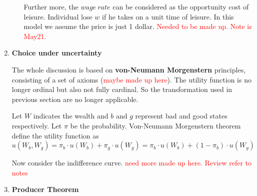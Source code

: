 \documentclass[10pt]{article}
\newenvironment{changemargin}[2]{%
  \begin{list}{}{%
    \setlength{\topsep}{0pt}%
    \setlength{\leftmargin}{#1}%
    \setlength{\rightmargin}{#2}%
    \setlength{\listparindent}{\parindent}%
    \setlength{\itemindent}{\parindent}%
    \setlength{\parsep}{\parskip}%
  }%
  \item[]}{\end{list}}
\begin{document}
\begin{changemargin}{-0.125in}{0in}
\begin{enumerate}
\begin{enumerate}
                        Further more, the $wage \: rate$ can be considered as the opportunity cost of leisure. Individual lose $w$ if he takes on a unit time of leisure. In this model we assume the price is just 1 dollar. \textcolor{red}{Needed to be made up. Note is May21.}
                        
                        
                          
                          
                        
                        
                  
                  \end{enumerate}
                  
                  \bigskip
                  
                  \item 
                   
                  \smallskip
                  
                  \textbf{Choice under uncertainty}
                 
                  \medskip
                  
                  The whole discussion is based on \textbf{von-Neumann Morgenstern} principles, consisting of a set of axioms (\textcolor{red}{maybe made up here}). The utility function is no longer ordinal but also not fully cardinal. So the transformation used in previous section are no longer applicable. 
                  
                  \medskip
                  
                  Let $W$ indicates the wealth and $b$ and $g$ represent bad and good states respectively. Let $\pi$ be the probability. Von-Neumann Morgenstern theorem define the utility function as 
                  \[
                  u(W_b,W_g) = \pi_b \cdot u(W_b) + \pi_g \cdot u(W_g) = \pi_b \cdot u(W_b) +  (1-\pi_b) \cdot u(W_g)
                  \]
                 
                  Now consider the indifference curve. \textcolor{red}{need more made up here. Review refer to notes}
                 
                 
                 \bigskip
                 
                 \item \textbf{Producer Theorem}
    

\end{enumerate}
\end{changemargin}
\end{document}
